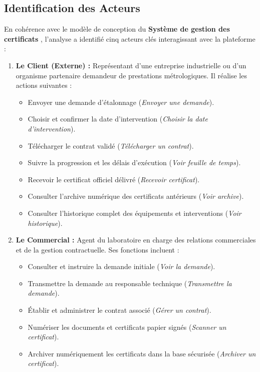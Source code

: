 \documentclass{bts-report}
\begin{document}
\subsection{Identification des Acteurs}
En coh\'erence avec le mod\`ele de conception du \textbf{\og Syst\`eme de gestion des certificats \fg}, l'analyse a identifi\'e cinq acteurs cl\'es interagissant avec la plateforme :
\begin{enumerate}
  \item \textbf{Le Client (Externe) :} Repr\'esentant d'une entreprise industrielle ou d'un organisme partenaire demandeur de prestations m\'etrologiques. Il r\'ealise les actions suivantes :
    \begin{itemize}
      \item Envoyer une demande d'\'etalonnage (\textit{Envoyer une demande}).
      \item Choisir et confirmer la date d'intervention (\textit{Choisir la date d'intervention}).
      \item T\'el\'echarger le contrat valid\'e (\textit{T\'el\'echarger un contrat}).
      \item Suivre la progression et les d\'elais d'ex\'ecution (\textit{Voir feuille de temps}).
      \item Recevoir le certificat officiel d\'elivr\'e (\textit{Recevoir certificat}).
      \item Consulter l'archive num\'erique des certificats ant\'erieurs (\textit{Voir archive}).
      \item Consulter l'historique complet des \'equipements et interventions (\textit{Voir historique}).
    \end{itemize}
  \item \textbf{Le Commercial :} Agent du laboratoire en charge des relations commerciales et de la gestion contractuelle. Ses fonctions incluent :
    \begin{itemize}
      \item Consulter et instruire la demande initiale (\textit{Voir la demande}).
      \item Transmettre la demande au responsable technique (\textit{Transmettre la demande}).
      \item \'Etablir et administrer le contrat associ\'e (\textit{G\'erer un contrat}).
      \item Num\'eriser les documents et certificats papier sign\'es (\textit{Scanner un certificat}).
      \item Archiver num\'eriquement les certificats dans la base s\'ecuris\'ee (\textit{Archiver un certificat}).

\end{itemize}
\end{enumerate}
\end{document}
